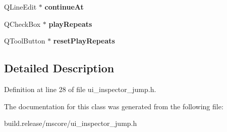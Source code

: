 \begin{DoxyCompactItemize}
\item 
\mbox{\label{class_ui___inspector_jump_aa446ce45a9f4d33d25793638fd1cc824}} 
Q\+Line\+Edit $\ast$ {\bfseries continue\+At}
\item 
\mbox{\label{class_ui___inspector_jump_a517cee2dcef62de3cca23f9bd0f50f9b}} 
Q\+Check\+Box $\ast$ {\bfseries play\+Repeats}
\item 
\mbox{\label{class_ui___inspector_jump_a48013d6fda12e53e6a6caf597844022a}} 
Q\+Tool\+Button $\ast$ {\bfseries reset\+Play\+Repeats}
\end{DoxyCompactItemize}


\subsection{Detailed Description}


Definition at line 28 of file ui\+\_\+inspector\+\_\+jump.\+h.



The documentation for this class was generated from the following file\+:\begin{DoxyCompactItemize}
\item 
build.\+release/mscore/ui\+\_\+inspector\+\_\+jump.\+h\end{DoxyCompactItemize}
